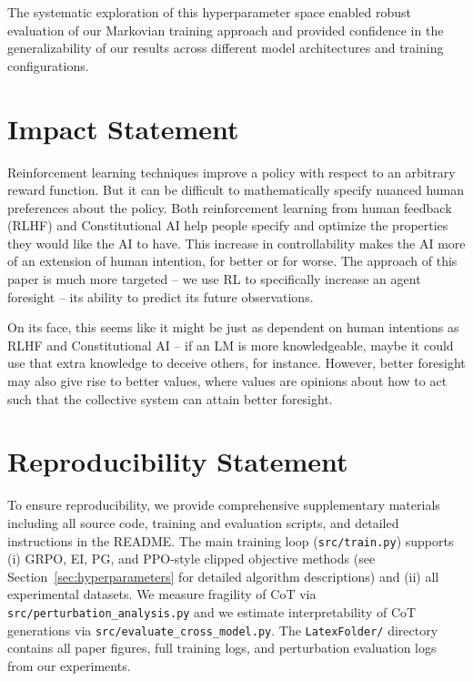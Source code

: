 \documentclass{article} %
\begin{document}
The systematic exploration of this hyperparameter space enabled robust evaluation of our Markovian training approach and provided confidence in the generalizability of our results across different model architectures and training configurations.


\section{Impact Statement}
\label{sec:ethics}
Reinforcement learning techniques improve a policy with respect to an arbitrary reward function. But it can be difficult to mathematically specify nuanced human preferences about the policy. Both reinforcement learning from human feedback (RLHF) \citep{christiano2023deepreinforcementlearninghuman} and Constitutional AI \citep{bai2022constitutional} help people specify and optimize the properties they would like the AI to have. This increase in controllability makes the AI more of an extension of human intention, for better or for worse. The approach of this paper is much more targeted -- we use RL to specifically increase an agent foresight -- its ability to predict its future observations. 

On its face, this seems like it might be just as dependent on human intentions as RLHF and Constitutional AI -- if an LM is more knowledgeable, maybe it could use that extra knowledge to deceive others, for instance. However, better foresight may also give rise to better values, where values are opinions about how to act such that the collective system can attain better foresight.

\section{Reproducibility Statement}
To ensure reproducibility, we provide comprehensive supplementary materials including all source code, training and evaluation scripts, and detailed instructions in the README. The main training loop (\texttt{src/train.py}) supports (i) GRPO, EI, PG, and PPO-style clipped objective methods (see Section~\ref{sec:hyperparameters} for detailed algorithm descriptions) and (ii) all experimental datasets. We measure fragility of CoT via \texttt{src/perturbation\_analysis.py} and we estimate interpretability of CoT generations via \texttt{src/evaluate\_cross\_model.py}. The \texttt{LatexFolder/} directory contains all paper figures, full training logs, and perturbation evaluation logs from our experiments.
\end{document}
